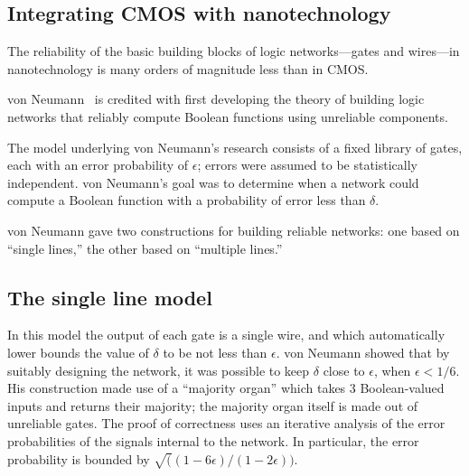 


\author{}
\date{}



\subsection*{Integrating CMOS with nanotechnology}

The reliability of the basic building blocks of logic networks---gates and 
wires---in nanotechnology is many orders of magnitude less than in CMOS.

von Neumann~\cite{neumann_noisy} is credited with first developing 
the theory of building logic networks that reliably compute
Boolean functions using unreliable components.  

The model underlying von Neumann's research consists of 
a fixed library of gates, each with an error probability of $\epsilon$;
errors were assumed to be statistically independent.
von Neumann's goal was to determine when a network could compute a 
Boolean function with a probability of error less than $\delta$.

von Neumann gave two constructions for building reliable networks:
one based on ``single lines,'' the other based on ``multiple lines.''

\subsection*{The single line model}

In this model the output of each gate is a single
wire, and which automatically lower bounds the value of $\delta$ to be not less
than $\epsilon$.  von Neumann showed that by suitably designing 
the network, it was possible to keep $\delta$ close to $\epsilon$,
when $\epsilon < 1/6$.  His construction made use of
a ``majority organ'' which takes 3 Boolean-valued
inputs and returns their majority; the majority organ itself is made
out of unreliable gates.  The proof of correctness uses an
iterative analysis of the error probabilities of the signals internal
to the network. 
In particular, the error probability is bounded by $\sqrt((1-6\epsilon)/(1-2\epsilon))$.  

